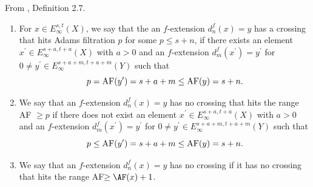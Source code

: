 \begin{definition}
\label{paper:2.7}
From \cite{LWX126}, Definition 2.7.\par
\label{def:98skj23}
\begin{enumerate}[leftmargin=*]
    \item For $x\in E_\infty^{s,t}(X)$, we say that the an $f$-extension $d_n^{f}(x)=y$ has a crossing that hits Adams filtration $p$ for some $p \leq s+n$, if there exists an element $x^\prime\in E_\infty^{s+a,t+a}(X)$ with $a>0$ and an $f$-extension $d_m^{f}(x^\prime)=y^\prime$ for $0\neq y^\prime\in E^{s+a+m, t+a+m}_\infty(Y)$ such that
    $$p = \textup{AF}(y^\prime) = s+a+m\le \textup{AF}(y) = s+n.$$
    \item We say that an $f$-extension $d_n^{f}(x)=y$ has no crossing that hits the range AF $\ge p$ if there does not exist an element $x^\prime\in E_\infty^{s+a,t+a}(X)$ with $a>0$ and an $f$-extension $d_m^{f}(x^\prime)=y^\prime$ for $0\neq y^\prime\in E^{s+a+m, t+a+m}_\infty(Y)$ such that
    $$p\le \textup{AF}(y^\prime) = s+a+m\le \textup{AF}(y) = s+n.$$
    \item We say that an $f$-extension $d_n^{f}(x)=y$ has no crossing if it has no crossing that hits the range AF$\ge \AF(x) + 1$.
\end{enumerate}




\sketch
\end{definition}


